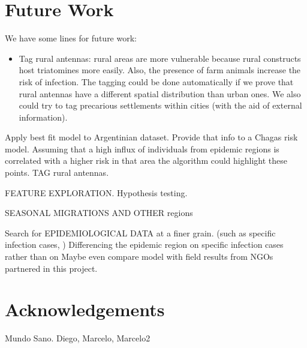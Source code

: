 \section{Future Work}
We have some lines for future work:
\begin{itemize}
    \item Tag rural antennas: rural areas are more vulnerable because rural constructs host triatomines more easily. Also, the presence of farm animals increase the risk of infection. The tagging could be done automatically if we prove that rural antennas have a different spatial distribution than urban ones. We also could try to tag precarious settlements within cities (with the aid of external information).

\end{itemize}
Apply best fit model to Argentinian dataset. Provide that info to a Chagas risk model. Assuming that a high influx of individuals from epidemic regions is correlated with a higher risk in that area the algorithm could highlight these points.
TAG rural antennas.

FEATURE EXPLORATION. Hypothesis testing. 

SEASONAL MIGRATIONS AND OTHER regions

Search for EPIDEMIOLOGICAL DATA at a finer grain. (such as specific infection cases, ) Differencing the epidemic region on specific infection cases rather than on
Maybe even compare model with field results from NGOs partnered in this project.

\section{Acknowledgements}
Mundo Sano. Diego, Marcelo, Marcelo2